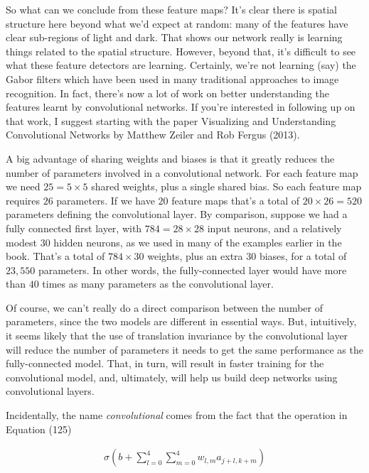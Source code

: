So what can we conclude from these feature maps? It's clear there is spatial structure here beyond what we'd expect at random: many of the features have clear sub-regions of light and dark. That shows our network really is learning things related to the spatial structure. However, beyond that, it's difficult to see what these feature detectors are learning. Certainly, we're not learning (say) the Gabor filters which have been used in many traditional approaches to image recognition. In fact, there's now a lot of work on better understanding the features learnt by convolutional networks. If you're interested in following up on that work, I suggest starting with the paper Visualizing and Understanding Convolutional Networks by Matthew Zeiler and Rob Fergus (2013).


A big advantage of sharing weights and biases is that it greatly reduces the number of parameters involved in a convolutional network. For each feature map we need $25 = 5 \times 5$ shared weights, plus a single shared bias. So each feature map requires $26$ parameters. If we have $20$ feature maps that's a total of $20 \times 26 = 520$ parameters defining the convolutional layer. By comparison, suppose we had a fully connected first layer, with $784 = 28 \times 28$ input neurons, and a relatively modest $30$ hidden neurons, as we used in many of the examples earlier in the book. That's a total of $784 \times 30$ weights, plus an extra $30$ biases, for a total of $23,550$ parameters. In other words, the fully-connected layer would have more than $40$ times as many parameters as the convolutional layer.


Of course, we can't really do a direct comparison between the number of parameters, since the two models are different in essential ways. But, intuitively, it seems likely that the use of translation invariance by the convolutional layer will reduce the number of parameters it needs to get the same performance as the fully-connected model. That, in turn, will result in faster training for the convolutional model, and, ultimately, will help us build deep networks using convolutional layers.


Incidentally, the name \emph{convolutional} comes from the fact that the operation in Equation (125)

\begin{align*}
\sigma\left(b + \sum_{l=0}^4 \sum_{m=0}^4 w_{l,m} a_{j+l, k+m} \right) \nonumber
\end{align*}

